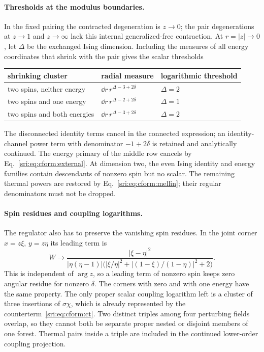 \paragraph{Thresholds at the modulus boundaries.} In the fixed pairing the contracted degeneration is $z\to0$; the
pair degenerations at $z\to1$ and $z\to\infty$ lack this internal generalized-free contraction. At $r=|z|\to0$, let
$\Delta$ be the exchanged Ising dimension. Including the measures of all energy coordinates that shrink with the pair
gives the scalar thresholds
\begin{center}\small
\begin{tabular}{@{}lll@{}}
\toprule
shrinking cluster & radial measure & logarithmic threshold\\
\midrule
two spins, neither energy & $\dd r\,r^{\Delta-3+2\delta}$ & $\Delta=2$\\
two spins and one energy & $\dd r\,r^{\Delta-2+2\delta}$ & $\Delta=1$\\
two spins and both energies & $\dd r\,r^{\Delta-3+2\delta}$ & $\Delta=2$\\
\bottomrule
\end{tabular}
\end{center}
The disconnected identity terms cancel in the connected expression; an identity-channel power term with denominator
$-1+2\delta$ is retained and analytically continued. The energy primary of the middle row cancels by
Eq.~\eqref{sri:eq:cform:external}. At dimension two, the even Ising identity and energy families contain descendants of
nonzero spin but no scalar. The remaining thermal powers are restored by Eq.~\eqref{sri:eq:cform:mellin}; their regular
denominators must not be dropped.

\paragraph{Spin residues and coupling logarithms.} The regulator also has to preserve the vanishing spin residues. In
the joint corner $x=z\xi$, $y=z\eta$ its leading term is
\begin{equation}
 W\longrightarrow\frac{|\xi-\eta|^2}{|\eta(\eta-1)|\bigl(|\xi/\eta|^2+|(1-\xi)/(1-\eta)|^2+2\bigr)}.
\end{equation}
This is independent of $\arg z$, so a leading term of nonzero spin keeps zero angular residue for nonzero $\delta$. The
corners with zero and with one energy have the same property. The only proper scalar coupling logarithm left is a
cluster of three insertions of $\sigma\chi$, which is already represented by the counterterm~\eqref{sri:eq:cform:ct}. Two
distinct triples among four perturbing fields overlap, so they cannot both be separate proper nested or disjoint
members of one forest. Thermal pairs inside a triple are included in the continued lower-order coupling projection.

